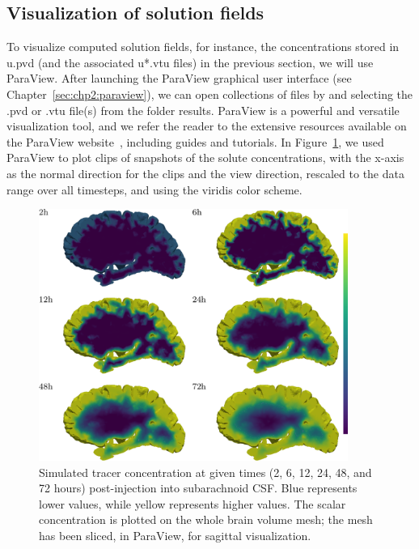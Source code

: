\subsection{Visualization of solution fields}
 To visualize computed solution fields, for instance,
the concentrations stored in u.pvd (and the associated u*.vtu files)
in the previous section, we will use ParaView. After launching the
ParaView graphical user interface (see
Chapter~\ref{sec:chp2:paraview}), we can open collections of files by
 and selecting the .pvd or .vtu file(s)
from the folder results. ParaView is a powerful and versatile
visualization tool, and we refer the reader to the extensive resources
available on the ParaView website~\cite{paraview:web}, including
guides and tutorials. In
Figure~\ref{fig:chp3:approximate-numerical-soln}, we used ParaView to
plot clips of snapshots of the solute concentrations, with the x-axis
as the normal direction for the clips and the view direction, rescaled
to the data range over all timesteps, and using the viridis color
scheme.
\begin{figure}[h]\centering
    \includegraphics[width=0.9\textwidth]{./graphics/chp3/mri-tracer/alltimes}
    \caption{Simulated tracer concentration at given times (2, 6, 12, 24, 48, 
	and 72 hours) post-injection into subarachnoid CSF. Blue 
	represents lower values, while yellow represents higher values. 
	The scalar concentration is plotted on the whole brain volume mesh; the 
	mesh has been sliced, in ParaView, for sagittal visualization.}
    \label{fig:chp3:approximate-numerical-soln}
\end{figure}

